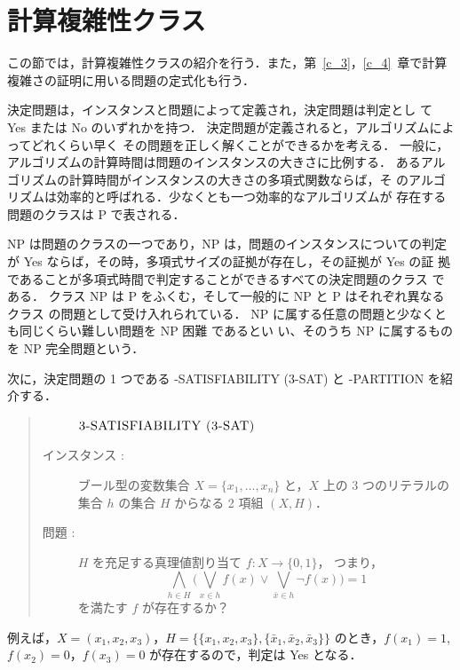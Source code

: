 \documentclass[12pt]{optlab-bachelor}
\begin{document}
\section{計算複雑性クラス}
この節では，計算複雑性クラスの紹介を行う．また，第~\ref{c_3}，\ref{c_4}~章で計算複雑さの証明に用いる問題の定式化も行う．

決定問題は，インスタンスと問題によって定義され，決定問題は判定とし
て Yes または No のいずれかを持つ．
決定問題が定義されると，アルゴリズムによってどれくらい早く
その問題を正しく解くことができるかを考える．
一般に，アルゴリズムの計算時間は問題のインスタンスの大きさに比例する．
あるアルゴリズムの計算時間がインスタンスの大きさの多項式関数ならば，そ
のアルゴリズムは効率的と呼ばれる．少なくとも一つ効率的なアルゴリズムが
存在する問題のクラスは P で表される．

NP は問題のクラスの一つであり，NP は，問題のインスタンスについての判定
が Yes ならば，その時，多項式サイズの証拠が存在し，その証拠が Yes の証
拠であることが多項式時間で判定することができるすべての決定問題のクラス
である．
クラス NP は P をふくむ，そして一般的に NP と P はそれぞれ異なるクラス
の問題として受け入れられている．
NP に属する任意の問題と少なくとも同じくらい難しい問題を NP 困難 であるとい
い、そのうち NP に属するものを NP 完全問題という．

次に，決定問題の 1 つである {-SATISFIABILITY (3-SAT)} と {-PARTITION} を紹介する．

\begin{quote}
  \begin{description}
    \item[] ${\mbox {\bf {\sc 3-SATISFIABILITY (3-SAT)}}}$
    \item[インスタンス : ] ブール型の変数集合 $X = \{x_1,\ldots,x_n\}$ と，$X$ 上の 3 つのリテラルの集合 $h$ の集合 $H$ からなる 2 項組 $(X,H)$．
    \item[問題 : ] $H$ を充足する真理値割り当て $f : X \to \{0,1\}$，
    つまり，
    \begin{displaymath}
      \displaystyle \bigwedge_{h \in H} \bigg(\bigvee_{x \in h}f(x) \lor
      \bigvee_{\bar x \in h}\lnot f(x) \bigg) = 1
    \end{displaymath}
    を満たす $f$ が存在するか？
  \end{description}
\end{quote}

例えば，$X = (x_1, x_2, x_3)$，$H = \{\{x_1, x_2,  x_3\}, \{\bar x_1, \bar x_2, \bar x_3\}\}$ のとき，$f(x_1) = 1$, $f(x_2) = 0$，$f(x_3) = 0$ が存在するので，判定は Yes となる．
\end{document}
